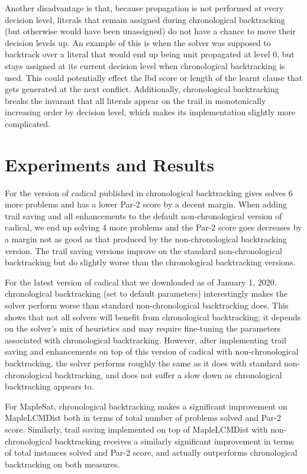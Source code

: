 \documentclass[runningheads]{llncs}
\begin{document}
Another disadvantage is that, because propagation is not performed at
every decision level, literals that remain assigned during
chronological backtracking (but otherwise would have been unassigned)
do not have a chance to move their decision levels up. An example of
this is when the solver was supposed to backtrack over a literal that
would end up being unit propagated at level 0, but stays assigned at
its current decision level when chronological backtracking is
used. This could potentially effect the lbd score or length of the
learnt clause that gets generated at the next conflict. Additionally,
chronological backtracking breaks the invarant that all literals
appear on the trail in monotonically increasing order by decision
level, which makes its implementation slightly more complicated.

\section{Experiments and Results}
For the version of cadical published in
\cite{DBLP:conf/sat/MohleB19}chronological backtracking gives solves 6
more problems and has a lower Par-2 score by a decent margin. When
adding trail saving and all enhancements to the default
non-chronological version of cadical, we end up solving 4 more problems
and the Par-2 score goes decreases by a margin not as good as that
produced by the non-chronological backtracking version. The trail saving
versions improve on the standard non-chronological backtracking but do
slightly worse than the chronological backtracking versions.

For the latest version of cadical that we downloaded as of January 1,
2020, chronological backtracking (set to default parameters)
interestingly makes the solver perform worse than standard
non-chronological backtracking does. This shows that not all solvers
will benefit from chronological backtracking; it depends on the solver's
mix of heuristics and may require fine-tuning the parameters associated
with chronological backtracking. However, after implementing trail
saving and enhancements on top of this version of cadical with
non-chronological backtracking, the solver performs roughly the same as
it does with standard non-chronological backtracking, and does not
suffer a slow down as chronological backtracking appears to.

For MapleSat, chronological backtracking makes a significant improvement
on MapleLCMDist both in terms of total number of problems solved and
Par-2 score. Similarly, trail saving implemented on top of MapleLCMDist
with non-chronological backtracking receives a similarly significant
improvement in terms of total instances solved and Par-2 score, and
actually outperforms chronological backtracking on both measures.
\end{document}
